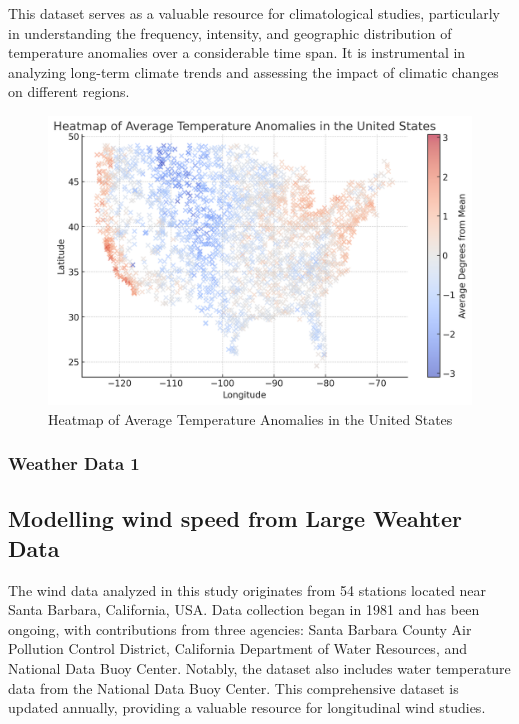 \documentclass[12pt, twoside,hidelinks]{article}
\theoremstyle{definition}
\numberwithin{equation}{section}
\begin{document}
This dataset serves as a valuable resource for climatological studies, particularly in understanding the frequency, intensity, and geographic distribution of temperature anomalies over a considerable time span. It is instrumental in analyzing long-term climate trends and assessing the impact of climatic changes on different regions.

\begin{figure}[ht]
    \centering
    \includegraphics[width=\textwidth]{visuals/weather_visuals/Heat_map_USA.png}
    \caption{Heatmap of Average Temperature Anomalies in the United States}
    \label{fig:heatmap_usa}
\end{figure}


\subsubsection{Weather Data 1}

\subsection{Modelling wind speed from Large Weahter Data}

The wind data analyzed in this study originates from 54 stations located near Santa Barbara, California, USA. Data collection began in 1981 and has been ongoing, with contributions from three agencies: Santa Barbara County Air Pollution Control District, California Department of Water Resources, and National Data Buoy Center. Notably, the dataset also includes water temperature data from the National Data Buoy Center. This comprehensive dataset is updated annually, providing a valuable resource for longitudinal wind studies.
\end{document}
